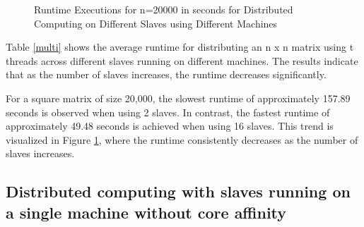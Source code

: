\documentclass[journal]{./IEEE/IEEEtran}
\begin{document}
\begin{figure}
    \centering
    \caption{Runtime Executions for n=20000 in seconds for Distributed Computing on Different Slaves using Different Machines}
    \label{multi_chart}
\end{figure}

Table \ref{multi} shows the average runtime for distributing an n x n matrix using t threads across different slaves running on different machines. The results indicate that as the number of slaves increases, the runtime decreases significantly.

For a square matrix of size 20,000, the slowest runtime of approximately 157.89 seconds is observed when using 2 slaves. In contrast, the fastest runtime of approximately 49.48 seconds is achieved when using 16 slaves. This trend is visualized in Figure \ref{multi_chart}, where the runtime consistently decreases as the number of slaves increases.

\subsection{Distributed computing with slaves running on a single machine without core affinity}
\end{document}
